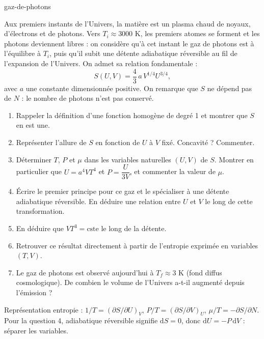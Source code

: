 \begin{exo}{gaz-de-photons}

Aux premiers instants de l'Univers, la matière est un plasma chaud de noyaux, d'électrons et de photons. Vers $T_i \approx 3000$ K, les premiers atomes se forment et les photons deviennent libres : on considère qu'à cet instant le gaz de photons est à l'équilibre à $T_i$, puis qu'il subit une détente adiabatique réversible au fil de l'expansion de l'Univers. On admet sa relation fondamentale :
\[
S(U,V) = \frac{4}{3}\,a\,V^{1/4}U^{3/4},
\]
avec $a$ une constante dimensionnée positive. On remarque que $S$ ne dépend pas de $N$ : le nombre de photons n'est pas conservé.

\begin{enumerate}
\item Rappeler la définition d'une fonction homogène de degré 1 et montrer que $S$ en est une.
\item Représenter l'allure de $S$ en fonction de $U$ à $V$ fixé. Concavité ? Commenter.
\item Déterminer $T$, $P$ et $\mu$ dans les variables naturelles $(U,V)$ de $S$. Montrer en particulier que $U = a^4VT^4$ et $P = \dfrac{U}{3V}$, et commenter la valeur de $\mu$.
\item Écrire le premier principe pour ce gaz et le spécialiser à une détente adiabatique réversible. En déduire une relation entre $U$ et $V$ le long de cette transformation.
\item En déduire que $VT^3 = \text{cste}$ le long de la détente.
\item Retrouver ce résultat directement à partir de l'entropie exprimée en variables $(T,V)$.
\item Le gaz de photons est observé aujourd'hui à $T_f \approx 3$ K (fond diffus cosmologique). De combien le volume de l'Univers a-t-il augmenté depuis l'émission ?
\end{enumerate}

\begin{indication}
Représentation entropie : $1/T = \left(\partial S/\partial U\right)_V$, $P/T = \left(\partial S/\partial V\right)_U$, $\mu/T = -\partial S/\partial N$. Pour la question 4, adiabatique réversible signifie $\mathrm{d}S = 0$, donc $\mathrm{d}U = -P\,\mathrm{d}V$ : séparer les variables.
\end{indication}


\end{exo}
